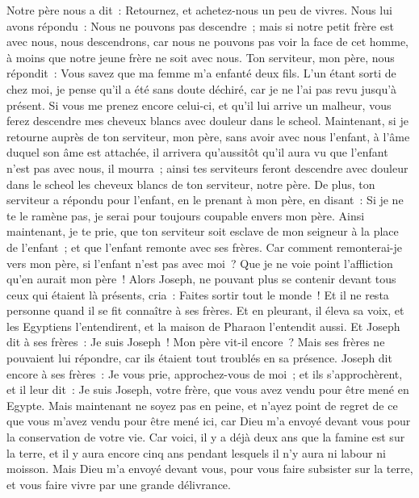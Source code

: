 \begin{multicols}{2}
Notre père nous a dit~: Retournez, et achetez-nous un peu de vivres.
Nous lui avons répondu~: Nous ne pouvons pas descendre~; mais si notre petit frère est avec nous, nous descendrons, car nous ne pouvons pas voir la face de cet homme, à moins que notre jeune frère ne soit avec nous.
Ton serviteur, mon père, nous répondit~: Vous savez que ma femme m'a enfanté deux fils.
L'un étant sorti de chez moi, je pense qu'il a été sans doute déchiré, car je ne l'ai pas revu jusqu'à présent.
Si vous me prenez encore celui-ci, et qu'il lui arrive un malheur, vous ferez descendre mes cheveux blancs avec douleur dans le scheol.
Maintenant, si je retourne auprès de ton serviteur, mon père, sans avoir avec nous l'enfant, à l'âme duquel son âme est attachée,
il arrivera qu'aussitôt qu'il aura vu que l'enfant n'est pas avec nous, il mourra~; ainsi tes serviteurs feront descendre avec douleur dans le scheol les cheveux blancs de ton serviteur, notre père.
De plus, ton serviteur a répondu pour l'enfant, en le prenant à mon père, en disant~: Si je ne te le ramène pas, je serai pour toujours coupable envers mon père.
Ainsi maintenant, je te prie, que ton serviteur soit esclave de mon seigneur à la place de l'enfant~; et que l'enfant remonte avec ses frères.
Car comment remonterai-je vers mon père, si l'enfant n'est pas avec moi~? Que je ne voie point l'affliction qu'en aurait mon père~!
\VerseOne{}Alors Joseph, ne pouvant plus se contenir devant tous ceux qui étaient là présents, cria~: Faites sortir tout le monde~! Et il ne resta personne quand il se fit connaître à ses frères.
Et en pleurant, il éleva sa voix, et les Egyptiens l'entendirent, et la maison de Pharaon l'entendit aussi.
Et Joseph dit à ses frères~: Je suis Joseph~! Mon père vit-il encore~? Mais ses frères ne pouvaient lui répondre, car ils étaient tout troublés en sa présence.
Joseph dit encore à ses frères~: Je vous prie, approchez-vous de moi~; et ils s'approchèrent, et il leur dit~: Je suis Joseph, votre frère, que vous avez vendu pour être mené en Egypte.
Mais maintenant ne soyez pas en peine, et n'ayez point de regret de ce que vous m'avez vendu pour être mené ici, car Dieu m'a envoyé devant vous pour la conservation de votre vie.
Car voici, il y a déjà deux ans que la famine est sur la terre, et il y aura encore cinq ans pendant lesquels il n'y aura ni labour ni moisson.
Mais Dieu m'a envoyé devant vous, pour vous faire subsister sur la terre, et vous faire vivre par une grande délivrance.

\end{multicols}
